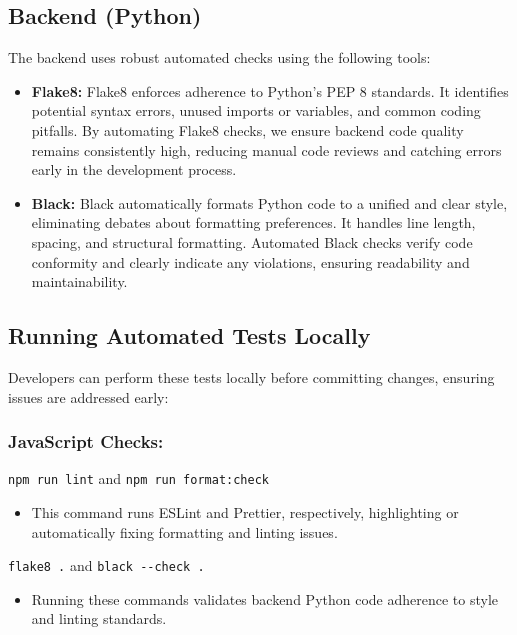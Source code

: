 \documentclass[12pt, titlepage]{article}
\begin{document}
\subsection{Backend (Python)}

The backend uses robust automated checks using the following tools:
\begin{itemize}
\item \textbf{Flake8:} Flake8 enforces adherence to Python's PEP 8 standards. It identifies potential syntax errors, unused imports or variables, and common coding pitfalls. By automating Flake8 checks, we ensure backend code quality remains consistently high, reducing manual code reviews and catching errors early in the development process.
\item \textbf{Black:} Black automatically formats Python code to a unified and clear style, eliminating debates about formatting preferences. It handles line length, spacing, and structural formatting. Automated Black checks verify code conformity and clearly indicate any violations, ensuring readability and maintainability.
\end{itemize}

\subsection{Running Automated Tests Locally}
Developers can perform these tests locally before committing changes, ensuring issues are addressed early:

\subsubsection{JavaScript Checks:}
\verb|npm run lint| and \verb|npm run format:check|
\begin{itemize}
\item This command runs ESLint and Prettier, respectively, highlighting or automatically fixing formatting and linting issues.
\end{itemize}

\verb|flake8 .| and \verb|black --check .|
\begin{itemize}
\item Running these commands validates backend Python code adherence to style and linting standards.
\end{itemize}
\end{document}
